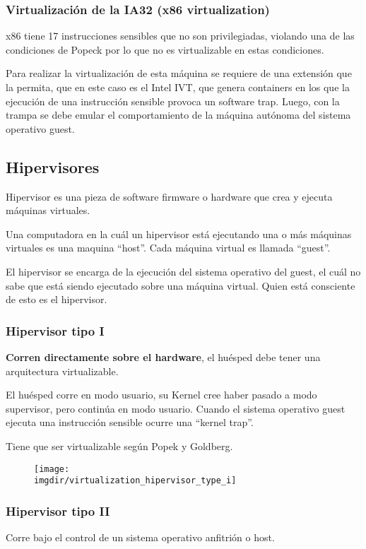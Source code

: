 \documentclass[a4paper, twoside]{article}
\newcommand{\imgdir}{../resources/images} %
\begin{document}
\subsubsection{Virtualización de la IA32 (x86 virtualization)}
x86 tiene 17 instrucciones sensibles que no son privilegiadas, violando una de las condiciones de Popeck por lo que no es virtualizable en estas condiciones.

Para realizar la virtualización de esta máquina se requiere de una extensión que la permita, que en este caso es el Intel IVT, que genera containers en los que la ejecución de una instrucción sensible provoca un software trap. Luego, con la trampa se debe emular el comportamiento de la máquina autónoma del sistema operativo guest.

\subsection{Hipervisores}
Hipervisor es una pieza de software firmware o hardware que crea y ejecuta máquinas virtuales.

Una computadora en la cuál un hipervisor está ejecutando una o más máquinas virtuales es una maquina ``host''. Cada máquina virtual es llamada ``guest''.

El hipervisor se encarga de la ejecución del sistema operativo del guest, el cuál no sabe que está siendo ejecutado sobre una máquina virtual. Quien está consciente de esto es el hipervisor.

\subsubsection{Hipervisor tipo I}
\textbf{Corren directamente sobre el hardware}, el huésped debe tener una arquitectura virtualizable.

El huésped corre en modo usuario, su Kernel cree haber pasado a modo supervisor, pero continúa en modo usuario.
Cuando el sistema operativo guest ejecuta una instrucción sensible ocurre una ``kernel trap''.

Tiene que ser virtualizable según Popek y Goldberg.

\begin{figure}[H]
	\centering
	\texttt{[image: \\imgdir/virtualization\_hipervisor\_type\_i]}
	\label{fig:virtualizacion_hipervisor_tipo_i}
\end{figure}

\subsubsection{Hipervisor tipo II}
Corre bajo el control de un sistema operativo anfitrión o host. 
\end{document}
